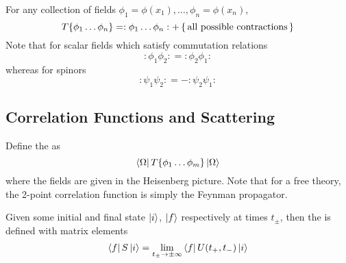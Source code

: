 \documentclass{article}
\begin{document}
\begin{theorem}
For any collection of fields $\phi_1 = \phi(x_1), \dots, \phi_n = \phi(x_n)$, 
\[
T \{ \phi_1 \dots \phi_n \} = :\phi_1 \dots \phi_n: + \set{\text{all possible contractions}}
\]
Note that for scalar fields which satisfy commutation relations 
\[
:\phi_1 \phi_2: = :\phi_2 \phi_1 : 
\]
whereas for spinors 
\[
:\psi_1 \psi_2: = -:\psi_2 \psi_1 : 
\]
\end{theorem}
\subsection{Correlation Functions and Scattering}

\begin{definition}
Define the  as 
\[
\bra{\Omega} T\{ \phi_1 \dots \phi_m \} \ket{\Omega}
\]
where the fields are given in the Heisenberg picture. Note that for a free theory, the 2-point correlation function is simply the Feynman propagator. 
\end{definition}

\begin{definition}[$S$-matrix]
Given some initial and final state $\ket{i}$, $\ket{f}$ respectively at times $t_\pm$, then the  is defined with matrix elements 
\[
\bra{f}S\ket{i} = \lim_{t_\pm \to \pm\infty} \bra{f} U(t_+, t_-) \ket{i}
\]
\end{definition}
\end{document}

